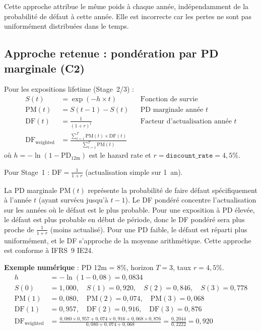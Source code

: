 \documentclass[12pt,a4paper]{article}
\begin{document}
Cette approche attribue le m\^eme poids \`a chaque ann\'ee, ind\'ependamment de la probabilit\'e de d\'efaut \`a cette ann\'ee. Elle est incorrecte car les pertes ne sont pas uniform\'ement distribu\'ees dans le temps.

\subsection{Approche retenue : pond\'eration par PD marginale (C2)}

\begin{formulebox}
Pour les expositions lifetime (Stage~2/3) :
\begin{align}
S(t) &= \exp(-h \times t) & &\text{Fonction de survie} \label{eq:survival} \\
\text{PM}(t) &= S(t-1) - S(t) & &\text{PD marginale ann\'ee } t \label{eq:marginal_pd} \\
\text{DF}(t) &= \frac{1}{(1+r)^t} & &\text{Facteur d'actualisation ann\'ee } t \\[8pt]
\text{DF}_{\text{weighted}} &= \frac{\displaystyle\sum_{t=1}^{T} \text{PM}(t) \times \text{DF}(t)}{\displaystyle\sum_{t=1}^{T} \text{PM}(t)} \label{eq:df_weighted}
\end{align}
o\`u $h = -\ln(1 - \text{PD}_{12\text{m}})$ est le hazard rate et $r = \texttt{discount\_rate} = 4{,}5\%$.

\medskip
Pour Stage~1 : $\text{DF} = \frac{1}{1+r}$ (actualisation simple sur 1~an).
\end{formulebox}

\begin{interpretbox}
La PD marginale $\text{PM}(t)$ repr\'esente la probabilit\'e de faire d\'efaut sp\'ecifiquement \`a l'ann\'ee $t$ (ayant survécu jusqu'\`a $t-1$). Le DF pond\'er\'e concentre l'actualisation sur les ann\'ees o\`u le d\'efaut est le plus probable. Pour une exposition \`a PD \'elev\'ee, le d\'efaut est plus probable en d\'ebut de p\'eriode, donc le DF pond\'er\'e sera plus proche de $\frac{1}{1+r}$ (moins actualis\'e). Pour une PD faible, le d\'efaut est r\'eparti plus uniform\'ement, et le DF s'approche de la moyenne arithm\'etique. Cette approche est conforme \`a IFRS~9 IE24.
\end{interpretbox}

\textbf{Exemple num\'erique} : PD 12m = 8\%, horizon $T = 3$, taux $r = 4{,}5\%$.
\begin{align*}
h &= -\ln(1 - 0{,}08) = 0{,}0834 \\
S(0) &= 1{,}000,\quad S(1) = 0{,}920,\quad S(2) = 0{,}846,\quad S(3) = 0{,}778 \\
\text{PM}(1) &= 0{,}080,\quad \text{PM}(2) = 0{,}074,\quad \text{PM}(3) = 0{,}068 \\
\text{DF}(1) &= 0{,}957,\quad \text{DF}(2) = 0{,}916,\quad \text{DF}(3) = 0{,}876 \\[4pt]
\text{DF}_{\text{weighted}} &= \frac{0{,}080 \times 0{,}957 + 0{,}074 \times 0{,}916 + 0{,}068 \times 0{,}876}{0{,}080 + 0{,}074 + 0{,}068} = \frac{0{,}2044}{0{,}2222} = 0{,}920
\end{align*}
\end{document}
